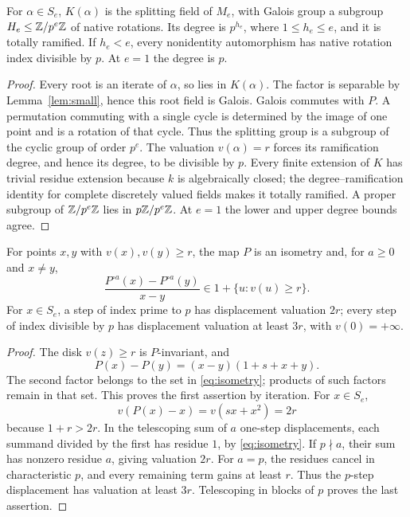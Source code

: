 \begin{lemma}\label{lem:rotation}
For \(\alpha\in S_e\), \(K(\alpha)\) is the splitting field of
\(M_e\), with Galois group a subgroup \(H_e\le\mathbb Z/p^e\mathbb Z\) of native
rotations. Its degree is \(p^{h_e}\), where \(1\le h_e\le e\),
and it is totally ramified. If \(h_e<e\), every nonidentity
automorphism has native rotation index divisible by \(p\).
At \(e=1\) the degree is \(p\).
\end{lemma}

\begin{proof}
Every root is an iterate of \(\alpha\), so lies in \(K(\alpha)\).
The factor is separable by Lemma~\ref{lem:small}, hence this root
field is Galois. Galois commutes with \(P\). A permutation
commuting with a single cycle is determined by the image of one
point and is a rotation of that cycle. Thus the splitting group
is a subgroup of the cyclic group of order \(p^e\).
The valuation \(v(\alpha)=r\) forces its ramification degree,
and hence its degree, to be divisible by \(p\). Every finite
extension of \(K\) has trivial residue extension because \(k\)
is algebraically closed; the degree--ramification identity for
complete discretely valued fields makes it totally ramified.
A proper subgroup of \(\mathbb Z/p^e\mathbb Z\) lies in \(p\mathbb Z/p^e\mathbb Z\).
At \(e=1\) the lower and upper degree bounds agree.
\end{proof}

\begin{lemma}\label{lem:displacement}
For points \(x,y\) with \(v(x),v(y)\ge r\), the map \(P\) is an
isometry and, for \(a\ge0\) and \(x\ne y\),
\begin{equation}\label{eq:isometry}
 \frac{P^{\circ a}(x)-P^{\circ a}(y)}{x-y}
 \in 1+\{u:v(u)\ge r\}.
\end{equation}
For \(x\in S_e\), a step of index prime to \(p\) has displacement
valuation \(2r\); every step of index divisible by \(p\) has
displacement valuation at least \(3r\), with \(v(0)=+\infty\).
\end{lemma}

\begin{proof}
The disk \(v(z)\ge r\) is \(P\)-invariant, and
\[
 P(x)-P(y)=(x-y)(1+s+x+y).
\]
The second factor belongs to the set in \eqref{eq:isometry};
products of such factors remain in that set. This proves the
first assertion by iteration.
For \(x\in S_e\),
\[
 v(P(x)-x)=v(sx+x^2)=2r
\]
because \(1+r>2r\). In the telescoping sum of \(a\) one-step
displacements, each summand divided by the first has residue
\(1\), by \eqref{eq:isometry}. If \(p\nmid a\), their sum has
nonzero residue \(a\), giving valuation \(2r\).
For \(a=p\), the residues cancel in characteristic \(p\), and
every remaining term gains at least \(r\). Thus the \(p\)-step
displacement has valuation at least \(3r\). Telescoping in
blocks of \(p\) proves the last assertion.
\end{proof}

